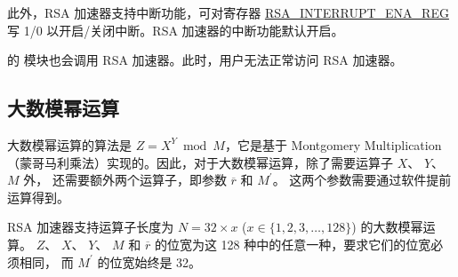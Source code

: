 \documentclass[main\_\_CN.tex]{subfiles}
\begin{document}
此外，RSA 加速器支持中断功能，可对寄存器 \hyperref[regdesc:RSAINTERRUPTENAREG]{RSA\_INTERRUPT\_ENA\_REG} 写 1/0 以开启/关闭中断。RSA 加速器的中断功能默认开启。

\begin{importantlisting}
\vspace{-0.5em}

    \chipname{} 的  模块也会调用 RSA 加速器。此时，用户无法正常访问 RSA 加速器。
\end{importantlisting}

\subsection{大数模幂运算} \label{sec:rsa-large-modular-Exponentiation}

大数模幂运算的算法是 \begin{math}Z = X^{Y} \bmod M\end{math}，它是基于 Montgomery Multiplication（蒙哥马利乘法）实现的。因此，对于大数模幂运算，除了需要运算子
\begin{math}X\end{math}、
\begin{math}Y\end{math}、
\begin{math}M\end{math} 外，
还需要额外两个运算子，即参数
\begin{math}\overline{r}\end{math} 和
\begin{math}M^{\prime}\end{math}。
这两个参数需要通过软件提前运算得到。

RSA 加速器支持运算子长度为
\begin{math}N = 32 \times x\end{math} (\begin{math}x \in \{ 1,2,3, \dots, 128\} \end{math}) 的大数模幂运算。
\begin{math}Z\end{math}、
\begin{math}X\end{math}、
\begin{math}Y\end{math}、
\begin{math}M\end{math} 和
\begin{math}\overline{r}\end{math}
的位宽为这 128 种中的任意一种，要求它们的位宽必须相同，
而 \begin{math}M^{\prime}\end{math} 的位宽始终是 32。
\end{document}
